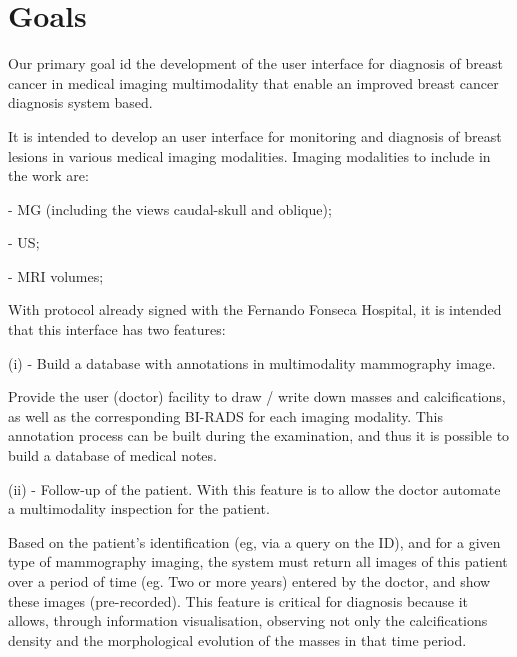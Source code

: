 
\chapter{Goals}
\label{chapter:goals}

Our primary goal id the development of the user interface for diagnosis of breast cancer in medical imaging multimodality that enable an improved breast cancer diagnosis system based.

It is intended to develop an user interface for monitoring and diagnosis of breast lesions in various medical imaging modalities. Imaging modalities to include in the work are:

- \gls{MG} (including the views caudal-skull and oblique);

- \gls{US};

- \gls{MRI} volumes;

With protocol already signed with the Fernando Fonseca Hospital, it is intended that this interface has two features:

(i) - Build a database with annotations in multimodality mammography image.

Provide the user (doctor) facility to draw / write down masses and calcifications, as well as the corresponding BI-RADS for each imaging modality. This annotation process can be built during the examination, and thus it is possible to build a database of medical notes.

(ii) - Follow-up of the patient. With this feature is to allow the doctor automate a multimodality inspection for the patient.

Based on the patient's identification (eg, via a query on the ID), and for a given type of mammography imaging, the system must return all images of this patient over a period of time (eg. Two or more years) entered by the doctor, and show these images (pre-recorded). This feature is critical for diagnosis because it allows, through information visualisation, observing not only the calcifications density and the morphological evolution of the masses in that time period.